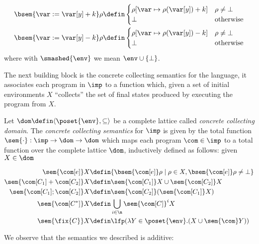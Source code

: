 \begin{definition}
\begin{align*}
    \bsem{\var:= \var[y] + k} \rho & \defin \begin{cases} \rho [\var\mapsto \rho(\var[y]) + k] & \rho \neq \bot \\ \bot & \text{otherwise}\end{cases} \\
    \bsem{\var:= \var[y] - k} \rho & \defin \begin{cases} \rho [\var\mapsto \rho(\var[y]) - k] & \rho \neq \bot \\ \bot & \text{otherwise}\end{cases} \\
  \end{align*}
  where with \(\smashed{\env}\) we mean \(\env \cup \{\bot\}\).
\end{definition}

The next building block is the concrete collecting semantics for the
language, it associates each program in \(\imp\) to a function which,
given a set of initial environments \(X\) ``collects'' the set of
final states produced by executing the program from \(X\).

\begin{definition}\label{de:concretesem}
  Let \(\dom \defin \langle \poset{\env} , \subseteq \rangle\) be a
  complete lattice called \emph{concrete collecting domain}. The
  \emph{concrete collecting semantics} for \(\imp\) is given by the
  total function \(\sem{\cdot} : \imp \to \dom \to \dom\) which maps
  each program \(\com \in \imp\) to a total function over the complete
  lattice \(\dom\), inductively defined as follows: given
  \(X \in \dom\)

  \begin{align*}
    \sem{\com[e]} X & \defin \{\bsem{\com[e]} \rho \mid \rho \in X,
                      \bsem{\com[e]} \rho \neq \bot\} \\
    \sem{\com[C_1] + \com[C_2]} X & \defin \sem{\com[C_1]} X \cup \sem{\com[C_2]} X \\
    \sem{\com[C_1] ; \com[C_2]} X & \defin \sem{\com[C_2]}(\sem{\com[C_1]} X) \\
    \sem{\com[C^*]} X & \defin \bigcup_{i \in \n} \sem{\com[C]}^i X \\
    \sem{\fix{C}} X & \defin \lfp(\lambda Y \in\poset{\env} . (X \cup \sem{\com}Y))
  \end{align*}
\end{definition}

We observe that the semantics we described is additive:

